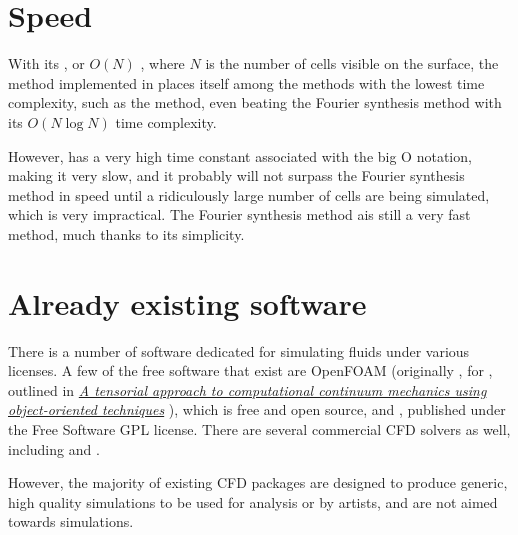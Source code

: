 \section{Speed}

With its , or $O(N)$ , where $N$ is the number of cells visible on the surface, the method implemented in \thisprojectwork places itself among the methods with the lowest time complexity, such as the \LPD method, even beating the Fourier synthesis method with its $O(N \log N)$ time complexity.

However, \thismethod has a very high time constant associated with the big O notation, making it very slow, and it probably will not surpass the Fourier synthesis method in speed until a ridiculously large number of cells are being simulated, which is very impractical. The Fourier synthesis method ais still a very fast method, much thanks to its simplicity.

\section{Already existing software}

There is a number of software dedicated for simulating fluids under various licenses. A few of the free software  that exist are OpenFOAM (originally , for \textit{}, outlined in \textit{\href{http://powerlab.fsb.hr/ped/kturbo/openfoam/docs/foam.pdf}{A tensorial approach to computational continuum mechanics using object-oriented techniques}} \citep{temp}), which is free and open source, and \Gerris \citep{temp}, published under the Free Software GPL license. There are several commercial CFD solvers as well, including \RealFlow and . %

However, the majority of existing CFD packages are designed to produce generic, high quality simulations to be used for analysis or by artists, and are not aimed towards \realtime simulations.